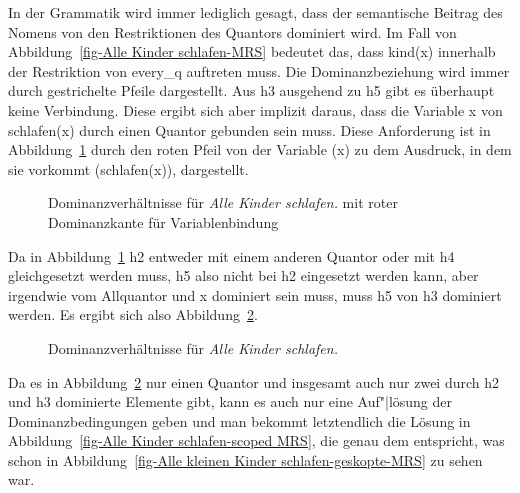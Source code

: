 In der Grammatik wird immer lediglich gesagt, dass der semantische Beitrag des Nomens von den
Restriktionen des Quantors dominiert wird. Im Fall von Abbildung~\ref{fig-Alle Kinder schlafen-MRS}
bedeutet das, dass kind(x) innerhalb der Restriktion von every\_q auftreten muss. Die
Dominanzbeziehung wird immer durch gestrichelte Pfeile dargestellt. Aus h3 ausgehend
zu h5 gibt es überhaupt keine Verbindung. Diese ergibt sich aber implizit daraus, dass die Variable
x von schlafen(x) durch einen Quantor gebunden sein muss. Diese Anforderung ist in
Abbildung~\ref{fig-Alle Kinder schlafen-MRS-Variable} durch den roten Pfeil von der
Variable (x) zu dem Ausdruck, in dem sie vorkommt (schlafen(x)), dargestellt.

\begin{figure}
\caption{Dominanzverhältnisse für \emph{Alle Kinder schlafen.} mit roter
  Dominanzkante für Variablenbindung}\label{fig-Alle Kinder schlafen-MRS-Variable}
\end{figure}
Da in Abbildung~\ref{fig-Alle Kinder schlafen-MRS-Variable} h2 entweder mit einem anderen Quantor
oder mit h4 gleichgesetzt werden muss, h5 also nicht bei h2 eingesetzt werden kann, aber irgendwie
vom Allquantor und x dominiert sein muss, muss h5 von h3 dominiert werden. Es ergibt sich also
Abbildung~\ref{fig-Alle Kinder schlafen-MRS-Restriktion-und-Body}.
\begin{figure}
\caption{Dominanzverhältnisse für \emph{Alle Kinder schlafen.}}\label{fig-Alle Kinder schlafen-MRS-Restriktion-und-Body}
\end{figure}
Da es in Abbildung~\ref{fig-Alle Kinder schlafen-MRS-Restriktion-und-Body} nur einen Quantor und
insgesamt auch nur zwei durch h2 und h3 dominierte Elemente gibt, kann es auch nur eine Auf"|lösung
der Dominanzbedingungen geben und man bekommt letztendlich die Lösung in Abbildung~\ref{fig-Alle Kinder
  schlafen-scoped MRS}, die genau dem entspricht, was schon in Abbildung~\ref{fig-Alle kleinen
  Kinder schlafen-geskopte-MRS} zu sehen war. 

